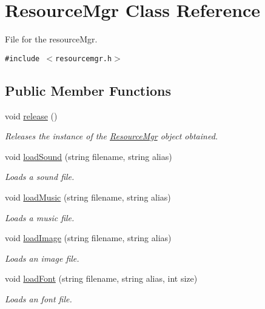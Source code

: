 \hypertarget{class_resource_mgr}{
\section{ResourceMgr Class Reference}
\label{class_resource_mgr}
}
File for the resourceMgr.  


{\tt \#include $<$resourcemgr.h$>$}

\subsection*{Public Member Functions}
\begin{CompactItemize}
\item 
void \hyperlink{class_resource_mgr_df71591bd5706857b2964efc9ab9aad0}{release} ()
\begin{CompactList}\small\item\em Releases the instance of the \hyperlink{class_resource_mgr}{ResourceMgr} object obtained. \item\end{CompactList}\item 
void \hyperlink{class_resource_mgr_b77815b1a5db3d233a519a65c129c6f5}{loadSound} (string filename, string alias)
\begin{CompactList}\small\item\em Loads a sound file. \item\end{CompactList}\item 
void \hyperlink{class_resource_mgr_3511f45844dc761fce18bcbb490b2782}{loadMusic} (string filename, string alias)
\begin{CompactList}\small\item\em Loads a music file. \item\end{CompactList}\item 
void \hyperlink{class_resource_mgr_c1db8b4941088c629ec264d6431ad68f}{loadImage} (string filename, string alias)
\begin{CompactList}\small\item\em Loads an image file. \item\end{CompactList}\item 
void \hyperlink{class_resource_mgr_58fc2207c264aa0bd958c4e1a6fe3307}{loadFont} (string filename, string alias, int size)
\begin{CompactList}\small\item\em Loads an font file. \item\end{CompactList}\item 

\end{CompactItemize}
